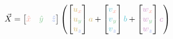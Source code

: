 \documentclass[preview]{standalone}
\begin{document}
$$\vec{X} = \begin{bmatrix}\textcolor[HTML]{f9a598}{\hat{x}}&\textcolor[HTML]{87c993}{\hat{y}}&\textcolor[HTML]{94acef}{\hat{z}}\end{bmatrix}\left(
\begin{bmatrix}\textcolor[HTML]{d4b76b}{u}_{\textcolor[HTML]{f9a598}{x}}\\\textcolor[HTML]{d4b76b}{u}_{\textcolor[HTML]{87c993}{y}}\\\textcolor[HTML]{d4b76b}{u}_{\textcolor[HTML]{94acef}{z}}\end{bmatrix}\textcolor[HTML]{d4b76b}{a} +
\begin{bmatrix}\textcolor[HTML]{58c4d5}{v}_{\textcolor[HTML]{f9a598}{x}}\\\textcolor[HTML]{58c4d5}{v}_{\textcolor[HTML]{87c993}{y}}\\\textcolor[HTML]{58c4d5}{v}_{\textcolor[HTML]{94acef}{z}}\end{bmatrix}\textcolor[HTML]{58c4d5}{b} +
\begin{bmatrix}\textcolor[HTML]{ce93ca}{w}_{\textcolor[HTML]{f9a598}{x}}\\\textcolor[HTML]{ce93ca}{w}_{\textcolor[HTML]{87c993}{y}}\\\textcolor[HTML]{ce93ca}{w}_{\textcolor[HTML]{94acef}{z}}\end{bmatrix}\textcolor[HTML]{ce93ca}{c}
\right)$$
\end{document}
